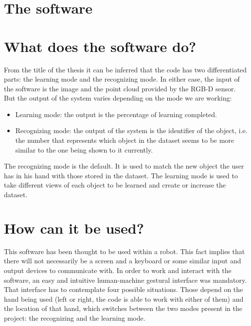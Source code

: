 \section{The software}

\section{What does the software do?}
From the title of the thesis it can be inferred that the code has two differentiated parts: the learning mode and the recognizing mode. In either case, the input of the software is the image and the point cloud provided by the RGB-D sensor. 
But the output of the system varies depending on the mode we are working: 
\\
\begin{itemize}
	\item 	Learning mode:  the output is the percentage of learning completed. 
	\item   Recognizing mode: the output of the system is the identifier of the object, i.e. the number that represents which object in the dataset seems to be more similar to the one being shown to it currently. 
\end{itemize}

The recognizing mode is the default. It is used to match the new object the user has in his hand with those stored in the dataset. 
The learning mode is used to take different views of each object to be learned and create or increase the dataset. 


\section{How can it be used?}
This software has been thought to be used within a robot. This fact implies that there will not necessarily be a screen and a keyboard or some similar input and output devices to communicate with. In order to work and interact with the software, an easy and intuitive human-machine gestural interface was mandatory.  
\\

That interface has to contemplate four possible situations. Those depend on the hand being used (left or right, the code is able to work with either of them) and the location of that hand, which switches between the two modes present in the project: the recognizing and the learning mode. 

